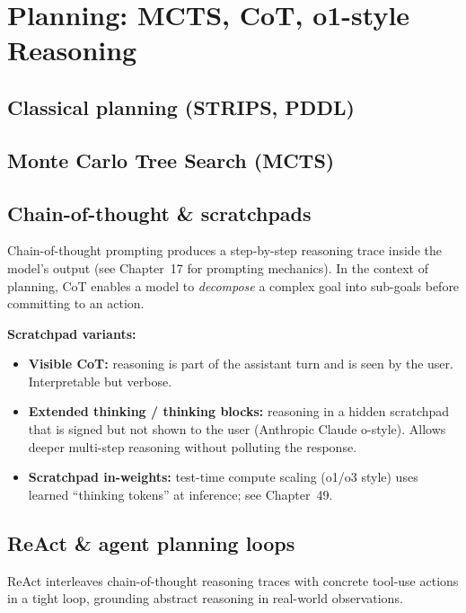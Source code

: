 
\section{Planning: MCTS, CoT, o1-style Reasoning}

\subsection{Classical planning (STRIPS, PDDL)}


\subsection{Monte Carlo Tree Search (MCTS)}


\subsection{Chain-of-thought \& scratchpads}

Chain-of-thought prompting produces a step-by-step reasoning trace inside the model's
output (see Chapter~17 for prompting mechanics). In the context of planning, CoT
enables a model to \emph{decompose} a complex goal into sub-goals before committing
to an action.

\textbf{Scratchpad variants:}
\begin{itemize}
  \item \textbf{Visible CoT:} reasoning is part of the assistant turn and is seen by
    the user. Interpretable but verbose.
  \item \textbf{Extended thinking / thinking blocks:} reasoning in a hidden scratchpad
    that is signed but not shown to the user (Anthropic Claude o-style). Allows deeper
    multi-step reasoning without polluting the response.
  \item \textbf{Scratchpad in-weights:} test-time compute scaling (o1/o3 style) uses
    learned ``thinking tokens'' at inference; see Chapter~49.
\end{itemize}

\subsection{ReAct \& agent planning loops}

\begin{paperbox}[title=ReAct: Synergizing Reasoning and Acting (Yao et al.\, 2023)]
  ReAct interleaves chain-of-thought reasoning traces with concrete tool-use actions
  in a tight loop, grounding abstract reasoning in real-world observations.
\end{paperbox}

